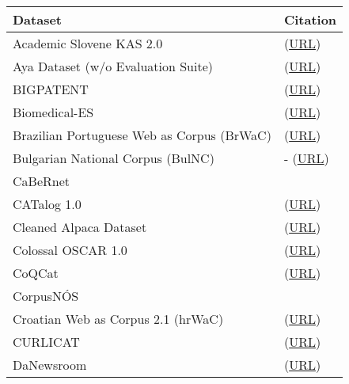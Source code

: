 \begin{longtable}{p{} | p{}}
    Dataset & Citation \\ \hline
    Academic Slovene KAS 2.0  & \citet{zagar_corpus_2022} (\href{https://www.clarin.si/repository/xmlui/handle/11356/1448}{URL}) \\ 
    Aya Dataset (w/o Evaluation Suite) & \citet{singh_aya_2024} (\href{https://huggingface.co/datasets/CohereForAI/aya\_dataset}{URL}) \\ 
    BIGPATENT & \citet{sharma_bigpatent_2019} (\href{https://evasharma.github.io/bigpatent/}{URL}) \\ 
    Biomedical-ES & \citet{carrino-etal-2022-pretrained} (\href{https://github.com/PlanTL-GOB-ES/lm-biomedical-clinical-es}{URL}) \\ 
    Brazilian Portuguese Web as Corpus (BrWaC) & \citet{wagner_filho_brwac_2018} (\href{https://huggingface.co/datasets/brwac}{URL}) \\ 
    Bulgarian National Corpus (BulNC) & - (\href{http://old.dcl.bas.bg/dataset/BulNC.7z}{URL}) \\ 
    CaBeRnet & \citet{popa-fabre_french_2020} \\ 
    CATalog 1.0 & \citet{palomar-giner_curated_2024} (\href{https://huggingface.co/datasets/projecte-aina/CATalog}{URL}) \\ 
    Cleaned Alpaca Dataset  & \citet{taori_alpaca_2023} (\href{https://huggingface.co/datasets/yahma/alpaca-cleaned}{URL}) \\ 
    Colossal OSCAR 1.0 & \citet{brack_community_2024} (\href{https://huggingface.co/datasets/oscar-corpus/colossal-oscar-1.0}{URL}) \\ 
    CoQCat & \citet{gonzalez-aguirre_building_2024} (\href{https://huggingface.co/datasets/projecte-aina/CoQCat}{URL}) \\ 
    CorpusNÓS & \citet{de-dios-flores-etal-2024-corpusnos} \\ 
    Croatian Web as Corpus 2.1 (hrWaC) & \citet{ljubesic_bshrsrwac_2014} (\href{http://nlp.ffzg.hr/resources/corpora/hrwac/}{URL}) \\ 
    CURLICAT & \citet{varadi_introducing_2022} (\href{https://cURLicat-project.eu/}{URL}) \\ 
    DaNewsroom & \citet{varab_danewsroom_2020} (\href{https://github.com/danielvarab/da-newsroom}{URL}) \\ 

\end{longtable}
